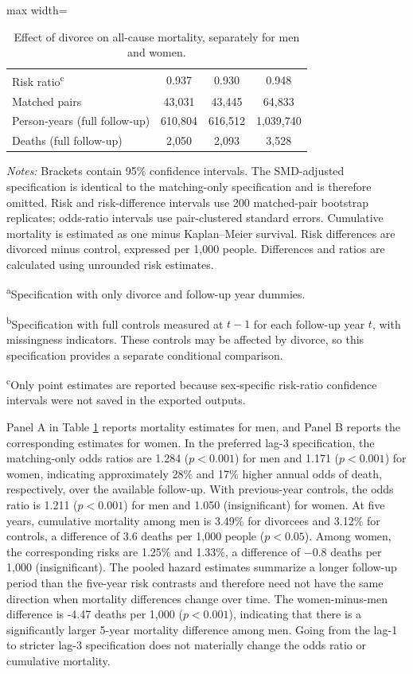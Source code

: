 \documentclass[a4paper,12pt]{article}
\theoremstyle{plain}
\theoremstyle{definition}
\theoremstyle{TheoremNum}
\theoremstyle{CorollaryNum}
\theoremstyle{PropositionNum}
\theoremstyle{TheoremNum}
\begin{document}
\begin{table}[H]
\begin{adjustbox}{max width=\textwidth}
\begin{tabular}{@{}lccc@{}}
Risk ratio\textsuperscript{c} & 0.937 & 0.930 & 0.948 \\
\addlinespace
\hline
Matched pairs & 43,031 & 43,445 & 64,833 \\
Person-years (full follow-up) & 610,804 & 616,512 & 1,039,740 \\
Deaths (full follow-up) & 2,050 & 2,093 & 3,528 \\
\bottomrule
\end{tabular}
\end{adjustbox}
\caption{Effect of divorce on all-cause mortality, separately for men and women.}
\label{tab:mortality_main_effect}
\begin{minipage}{\textwidth}
\footnotesize
\textit{Notes:} Brackets contain 95\% confidence intervals. The SMD-adjusted specification is identical to the matching-only specification and is therefore omitted. Risk and risk-difference intervals use 200 matched-pair bootstrap replicates; odds-ratio intervals use pair-clustered standard errors. Cumulative mortality is estimated as one minus Kaplan--Meier survival. Risk differences are divorced minus control, expressed per 1,000 people. Differences and ratios are calculated using unrounded risk estimates.

\textsuperscript{a}Specification with only divorce and follow-up year dummies.

\textsuperscript{b}Specification with full controls measured at $t-1$ for each follow-up year $t$, with missingness indicators. These controls may be affected by divorce, so this specification provides a separate conditional comparison.

\textsuperscript{c}Only point estimates are reported because sex-specific risk-ratio confidence intervals were not saved in the exported outputs.
\end{minipage}
\end{table}

Panel A in Table \ref{tab:mortality_main_effect} reports mortality estimates for men, and Panel B reports the corresponding estimates for women. In the preferred lag-3 specification, the matching-only odds ratios are 1.284 ($p < 0.001$) for men and 1.171 ($p < 0.001$) for women, indicating approximately 28\% and 17\% higher annual odds of death, respectively, over the available follow-up. With previous-year controls, the odds ratio is 1.211 ($p < 0.001$) for men and 1.050 (insignificant) for women. At five years, cumulative mortality among men is 3.49\% for divorcees and 3.12\% for controls, a difference of 3.6 deaths per 1,000 people ($p < 0.05$). Among women, the corresponding risks are 1.25\% and 1.33\%, a difference of $-0.8$ deaths per 1,000 (insignificant). The pooled hazard estimates summarize a longer follow-up period than the five-year risk contrasts and therefore need not have the same direction when mortality differences change over time. The women-minus-men difference is -4.47 deaths per 1,000 ($p < 0.001$), indicating that there is a significantly larger 5-year mortality difference among men. Going from the lag-1 to stricter lag-3 specification does not materially change the odds ratio or cumulative mortality.
\end{document}
